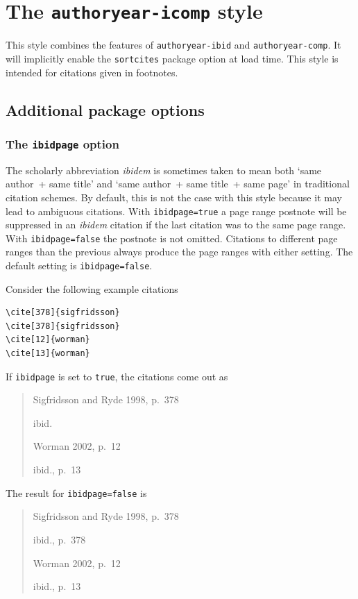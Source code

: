 \documentclass[a4paper]{article}
\begin{document}
\section*{The \texttt{authoryear-icomp} style}

This style combines the features of \texttt{authoryear-ibid} and
\texttt{authoryear-comp}. It will implicitly enable the
\texttt{sortcites} package option at load time. This style is
intended for citations given in footnotes.

\subsection*{Additional package options}

\subsubsection*{The \texttt{ibidpage} option}

The scholarly abbreviation \emph{ibidem} is sometimes taken to mean
both `same author~+ same title' and `same author~+ same title~+ same
page' in traditional citation schemes. By default, this is not the
case with this style because it may lead to ambiguous citations.
With \texttt{ibidpage=true} a page range postnote will be suppressed
in an \emph{ibidem} citation if the last citation was to the same
page range. With \texttt{ibidpage=false} the postnote is not omitted.
Citations to different page ranges than the previous always produce
the page ranges with either setting.
The default setting is \texttt{ibidpage=false}.

Consider the following example citations
\begin{verbatim}
\cite[378]{sigfridsson}
\cite[378]{sigfridsson}
\cite[12]{worman}
\cite[13]{worman}
\end{verbatim}
%
If \texttt{ibidpage} is set to \texttt{true}, the citations
come out as
\begin{quote}
Sigfridsson and Ryde 1998, p.~378

ibid.

Worman 2002, p.~12

ibid., p.~13
\end{quote}
%
The result for \texttt{ibidpage=false} is
\begin{quote}
Sigfridsson and Ryde 1998, p.~378

ibid., p.~378

Worman 2002, p.~12

ibid., p.~13
\end{quote}
\end{document}
